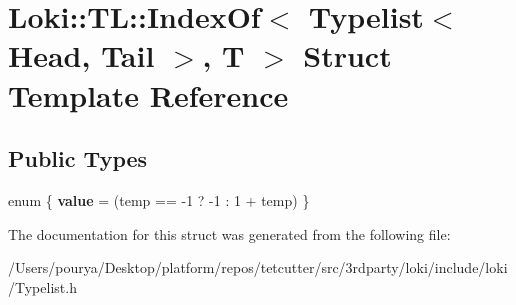 \hypertarget{structLoki_1_1TL_1_1IndexOf_3_01Typelist_3_01Head_00_01Tail_01_4_00_01T_01_4}{}\section{Loki\+:\+:T\+L\+:\+:Index\+Of$<$ Typelist$<$ Head, Tail $>$, T $>$ Struct Template Reference}
\label{structLoki_1_1TL_1_1IndexOf_3_01Typelist_3_01Head_00_01Tail_01_4_00_01T_01_4}
\subsection*{Public Types}
\begin{DoxyCompactItemize}
\item 
\hypertarget{structLoki_1_1TL_1_1IndexOf_3_01Typelist_3_01Head_00_01Tail_01_4_00_01T_01_4_aa890a456d1aa90099d77c927b42a0864}{}enum \{ {\bfseries value} = (temp == -\/1 ? -\/1 \+: 1 + temp)
 \}\label{structLoki_1_1TL_1_1IndexOf_3_01Typelist_3_01Head_00_01Tail_01_4_00_01T_01_4_aa890a456d1aa90099d77c927b42a0864}

\end{DoxyCompactItemize}


The documentation for this struct was generated from the following file\+:\begin{DoxyCompactItemize}
\item 
/\+Users/pourya/\+Desktop/platform/repos/tetcutter/src/3rdparty/loki/include/loki/Typelist.\+h\end{DoxyCompactItemize}
